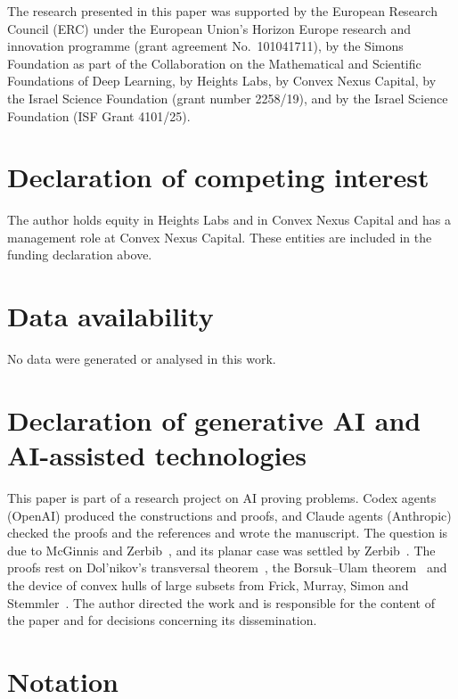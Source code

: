 \documentclass[11pt]{amsart}
\theoremstyle{remark}
\begin{document}
The research presented in this paper was supported by the European Research Council (ERC) under the European Union's
Horizon Europe research and innovation programme (grant agreement No.~101041711), by the Simons Foundation as part of
the Collaboration on the Mathematical and Scientific Foundations of Deep Learning, by Heights Labs, by Convex Nexus
Capital, by the Israel Science Foundation (grant number 2258/19), and by the Israel Science Foundation (ISF Grant
4101/25).

\section*{Declaration of competing interest}
The author holds equity in Heights Labs and in Convex Nexus Capital and has a management role at Convex Nexus Capital.
These entities are included in the funding declaration above.

\section*{Data availability}
No data were generated or analysed in this work.

\section*{Declaration of generative AI and AI-assisted technologies}
This paper is part of a research project on AI proving problems. Codex agents (OpenAI) produced the constructions and
proofs, and Claude agents (Anthropic) checked the proofs and the references and wrote the manuscript. The question is
due to McGinnis and Zerbib~\cite{MZ24}, and its planar case was settled by Zerbib~\cite{Zer24}. The proofs rest on
Dol'nikov's transversal theorem~\cite{Dol92}, the Borsuk--Ulam theorem~\cite{Bor33} and the device of convex hulls of large
subsets from Frick, Murray, Simon and Stemmler~\cite{FMSS24}. The author directed the work and is responsible for the content of the paper and for decisions
concerning its dissemination.

\appendix
\section{Notation}\label{app:notation}
\end{document}
